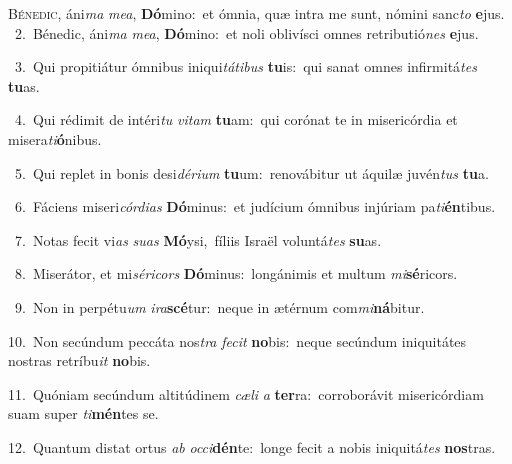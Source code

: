 \lettrine{\initial\textcolor{\initialcolor}{B}}{énedic,} áni\textit{ma} \textit{me}\-\textit{a}, \textbf{Dó}\-mino:~\star et ómnia, quæ intra me sunt, nómini sanc\textit{to} \textbf{e}\-jus.\\
{\numbfont\textcolor{\numbcolor}{~2.}}~Bénedic, áni\textit{ma} \textit{me}\-\textit{a}, \textbf{Dó}\-mino:~\star et noli oblivísci omnes retributió\textit{nes} \textbf{e}\-jus.\par
{\numbfont\textcolor{\numbcolor}{~3.}}~Qui propitiátur ómnibus iniqui\-\textit{tá}\-\textit{ti}\textit{bus} \textbf{tu}\-is:~\star qui sanat omnes infirmitá\textit{tes} \textbf{tu}\-as.\par
{\numbfont\textcolor{\numbcolor}{~4.}}~Qui rédimit de intéri\textit{tu} \textit{vi}\-\textit{tam} \textbf{tu}\-am:~\star qui corónat te in misericórdia et misera\-\textit{ti}\-\textbf{ó}nibus.\par
{\numbfont\textcolor{\numbcolor}{~5.}}~Qui replet in bonis desi\-\textit{dé}\-\textit{ri}\textit{um} \textbf{tu}\-um:~\star renovábitur ut áquilæ juvén\textit{tus} \textbf{tu}\-a.\par
{\numbfont\textcolor{\numbcolor}{~6.}}~Fáciens miseri\-\textit{cór}\-\textit{di}\textit{as} \textbf{Dó}\-minus:~\star et judícium ómnibus injúriam pa\-\textit{ti}\-\textbf{én}tibus.\par
{\numbfont\textcolor{\numbcolor}{~7.}}~Notas fecit vi\textit{as} \textit{su}\-\textit{as} \textbf{Mó}\-ysi,~\star fíliis Israël voluntá\textit{tes} \textbf{su}\-as.\par
{\numbfont\textcolor{\numbcolor}{~8.}}~Miserátor, et mi\-\textit{sé}\-\textit{ri}\textit{cors} \textbf{Dó}\-minus:~\star longánimis et multum \textit{mi}\-\textbf{sé}ricors.\par
{\numbfont\textcolor{\numbcolor}{~9.}}~Non in perpétu\textit{um} \textit{i}\-\textit{ra}\textbf{scé}tur:~\star neque in ætérnum com\-\textit{mi}\-\textbf{ná}bitur.\par
{\numbfont\textcolor{\numbcolor}{10.}}~Non secúndum peccáta nos\textit{tra} \textit{fe}\-\textit{cit} \textbf{no}\-bis:~\star neque secúndum iniquitátes nostras retríbu\textit{it} \textbf{no}\-bis.\par
{\numbfont\textcolor{\numbcolor}{11.}}~Quóniam secúndum altitúdinem \textit{cæ}\-\textit{li} \textit{a} \textbf{ter}\-ra:~\star corroborávit misericórdiam suam super \textit{ti}\-\textbf{mén}tes se.\par
{\numbfont\textcolor{\numbcolor}{12.}}~Quantum distat ortus \textit{ab} \textit{oc}\-\textit{ci}\textbf{dén}te:~\star longe fecit a nobis iniquitá\textit{tes} \textbf{nos}\-tras.\par
